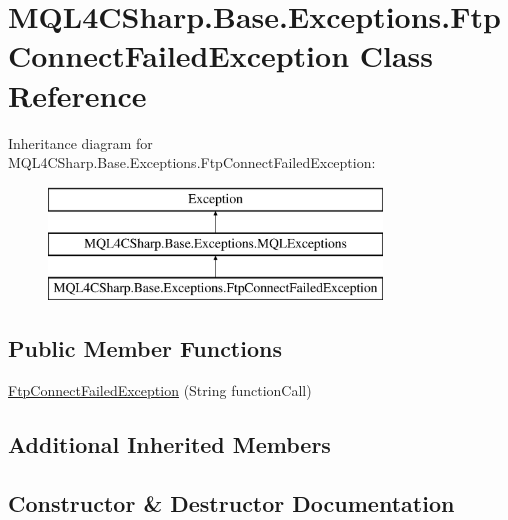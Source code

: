 \hypertarget{class_m_q_l4_c_sharp_1_1_base_1_1_exceptions_1_1_ftp_connect_failed_exception}{}\section{M\+Q\+L4\+C\+Sharp.\+Base.\+Exceptions.\+Ftp\+Connect\+Failed\+Exception Class Reference}
\label{class_m_q_l4_c_sharp_1_1_base_1_1_exceptions_1_1_ftp_connect_failed_exception}
Inheritance diagram for M\+Q\+L4\+C\+Sharp.\+Base.\+Exceptions.\+Ftp\+Connect\+Failed\+Exception\+:\begin{figure}[H]
\begin{center}
\leavevmode
\includegraphics[height=3.000000cm]{class_m_q_l4_c_sharp_1_1_base_1_1_exceptions_1_1_ftp_connect_failed_exception}
\end{center}
\end{figure}
\subsection*{Public Member Functions}
\begin{DoxyCompactItemize}
\item 
\hyperlink{class_m_q_l4_c_sharp_1_1_base_1_1_exceptions_1_1_ftp_connect_failed_exception_abafa72269055651ea904c8246c72a012}{Ftp\+Connect\+Failed\+Exception} (String function\+Call)
\end{DoxyCompactItemize}
\subsection*{Additional Inherited Members}


\subsection{Constructor \& Destructor Documentation}
